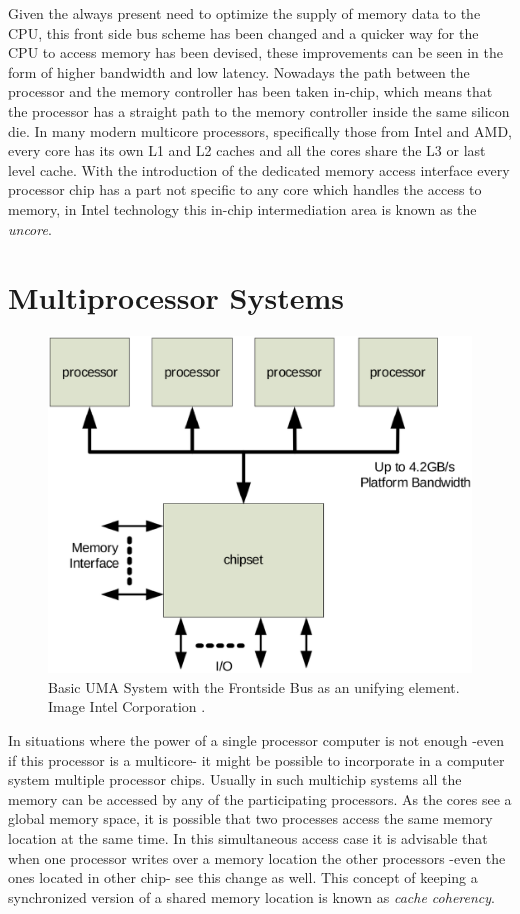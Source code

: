 Given the always present need to optimize the supply of memory data to the CPU, this front side bus scheme has been changed and a quicker way for the CPU to access memory has been devised, these improvements can be seen in the form of higher bandwidth and low latency. Nowadays the path between the processor and the memory controller has been taken in-chip, which means that the processor has a straight path to the memory controller inside the same silicon die. In many modern multicore processors, specifically those from Intel and AMD, every core has its own L1 and L2 caches and all the cores share the L3 or last level cache. With the introduction of the dedicated memory access interface every processor chip has a part not specific to any core which handles the access to memory, in Intel technology this in-chip intermediation area is known as the \textit{uncore}.

\section{Multiprocessor Systems}\label{section:multiproc}

\begin{figure}
	\centering
		\includegraphics[width=.6\textwidth]{figures/uma1.eps}
		\caption[basic-uma]{Basic UMA System with the Frontside Bus as an unifying element. Image Intel Corporation \cite{qpi-intel}. }
		\label{fig:uma1}
\end{figure}

In situations where the power of a single processor computer is not enough -even if this processor is a multicore- it might be possible to incorporate in a computer system multiple processor chips. Usually in such multichip systems all the memory can be accessed by any of the participating processors. As the cores see a global memory space, it is possible that two processes access the same memory location at the same time. In this simultaneous access case it is advisable that when one processor writes over a memory location the other processors -even the ones located in other chip- see this change as well. This concept of keeping a synchronized version of a shared memory location is known as \textit{cache coherency}. 

